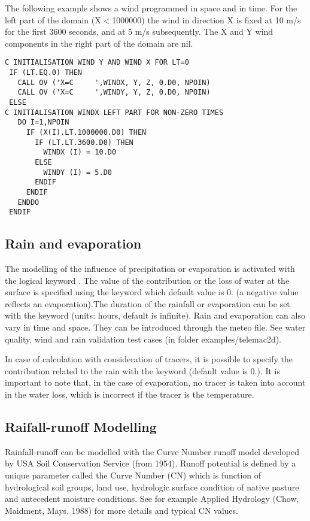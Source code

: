  The following example shows a wind programmed in space and in time. For the left part of the domain (X$<$1000000) the wind in direction X is fixed at 10 m/s for the first 3600 seconds, and at 5 m/s subsequently. The X and Y wind components in the right part of the domain are nil.

\begin{lstlisting}[language=TelFortran]
C INITIALISATION WIND Y AND WIND X FOR LT=0
 IF (LT.EQ.0) THEN
   CALL OV ('X=C     ',WINDX, Y, Z, 0.D0, NPOIN)
   CALL OV ('X=C     ',WINDY, Y, Z, 0.D0, NPOIN)
 ELSE
C INITIALISATION WINDX LEFT PART FOR NON-ZERO TIMES
   DO I=1,NPOIN
     IF (X(I).LT.1000000.D0) THEN
       IF (LT.LT.3600.D0) THEN
         WINDX (I) = 10.D0
       ELSE
         WINDY (I) = 5.D0
       ENDIF
     ENDIF
   ENDDO
 ENDIF
\end{lstlisting}
\subsection{ Rain and evaporation}

 The modelling of the influence of precipitation or evaporation is activated with the logical keyword . The value of the contribution or the loss of water at the surface is specified using the keyword  which default value is 0. (a negative value reflects an evaporation).The duration of the rainfall or evaporation can be set with the keyword  (units: hours, default is infinite). Rain and evaporation can also vary in time and space. They can be introduced through the meteo file. See water quality, wind and rain validation test cases (in folder examples/telemac2d).

 In case of calculation with consideration of tracers, it is possible to specify the contribution related to the rain with the keyword  (default value is 0.). It is important to note that, in the case of evaporation, no tracer is taken into account in the water loss, which is incorrect if the tracer is the temperature.

\subsection{Raifall-runoff Modelling}

Rainfall-runoff can be modelled with the Curve Number runoff model developed by USA Soil Conservation Service (from 1954). Runoff potential is defined by a unique parameter called the Curve Number (CN) which is function of hydrological soil groups, land use, hydrologic surface condition of native pasture and antecedent moisture conditions. See for example Applied Hydrology (Chow, Maidment, Mays, 1988) for more details and typical CN values. 

